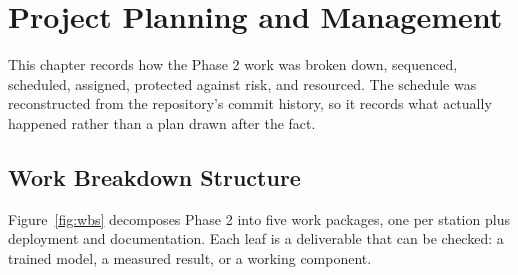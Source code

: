 \chapter{Project Planning and Management}
\label{ch:planning}
\label{sec:project-planning}

This chapter records how the Phase 2 work was broken down, sequenced, scheduled, assigned, protected against risk, and resourced. The schedule was reconstructed from the repository's commit history, so it records what actually happened rather than a plan drawn after the fact.

\section{Work Breakdown Structure}
\label{sec:wbs}
Figure~\ref{fig:wbs} decomposes Phase 2 into five work packages, one per station plus deployment and documentation. Each leaf is a deliverable that can be checked: a trained model, a measured result, or a working component.

